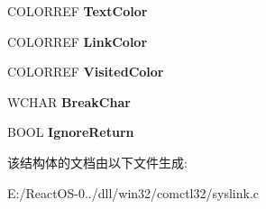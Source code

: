 \begin{DoxyCompactItemize}
\item 
\mbox{\label{struct_s_y_s_l_i_n_k___i_n_f_o_aa8776ed87b812c180c2ff0885cd350a2}} 
C\+O\+L\+O\+R\+R\+EF {\bfseries Text\+Color}
\item 
\mbox{\label{struct_s_y_s_l_i_n_k___i_n_f_o_a8d5475bd23904e641fd57e4c48b887c1}} 
C\+O\+L\+O\+R\+R\+EF {\bfseries Link\+Color}
\item 
\mbox{\label{struct_s_y_s_l_i_n_k___i_n_f_o_a01747b3d18aa6b50b21a17834b013510}} 
C\+O\+L\+O\+R\+R\+EF {\bfseries Visited\+Color}
\item 
\mbox{\label{struct_s_y_s_l_i_n_k___i_n_f_o_ab2ab9a79988dfda61422fe2bfac895bc}} 
W\+C\+H\+AR {\bfseries Break\+Char}
\item 
\mbox{\label{struct_s_y_s_l_i_n_k___i_n_f_o_a80348a79ad58c6b37328cc7697bd5712}} 
B\+O\+OL {\bfseries Ignore\+Return}
\end{DoxyCompactItemize}


该结构体的文档由以下文件生成\+:\begin{DoxyCompactItemize}
\item 
E\+:/\+React\+O\+S-\/0../dll/win32/comctl32/syslink.\+c\end{DoxyCompactItemize}
